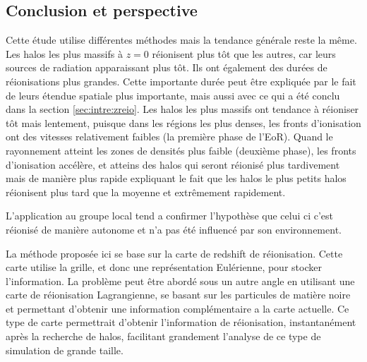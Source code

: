 \subsection{Conclusion et perspective}

Cette étude utilise différentes méthodes mais la tendance générale reste la même.
Les halos les plus massifs à $z=0$ réionisent plus tôt que les autres, car leurs sources de radiation apparaissant plus tôt.
Ils ont également des durées de réionisations plus grandes.
Cette importante durée peut être expliquée par le fait de leurs étendue spatiale plus importante, mais aussi avec ce qui a été conclu dans la section \ref{sec:intre:zreio}.
Les halos les plus massifs ont tendance à réioniser tôt mais lentement, puisque dans les régions les plus denses, les fronts d'ionisation ont des vitesses relativement faibles (la première phase de l'\ac{EoR}).
Quand le rayonnement atteint les zones de densités plus faible (deuxième phase), les fronts d'ionisation accélère, et atteins des halos qui seront réionisé plus tardivement mais de manière plus rapide expliquant le fait que les halos le plus petits halos réionisent plus tard que la moyenne et extrêmement rapidement.

L'application au groupe local tend a confirmer l'hypothèse que celui ci c'est réionisé de manière autonome et n'a pas été influencé par son environnement.

La méthode proposée ici se base sur la carte de redshift de réionisation.
Cette carte utilise la grille, et donc une représentation Eulérienne, pour stocker l'information.%
La problème peut être abordé sous un autre angle en utilisant une carte de réionisation Lagrangienne, se basant sur les particules de matière noire et permettant d'obtenir une information complémentaire a la carte actuelle.
Ce type de carte permettrait d'obtenir l'information de réionisation, instantanément après la recherche de halos, facilitant grandement l'analyse de ce type de simulation de grande taille.